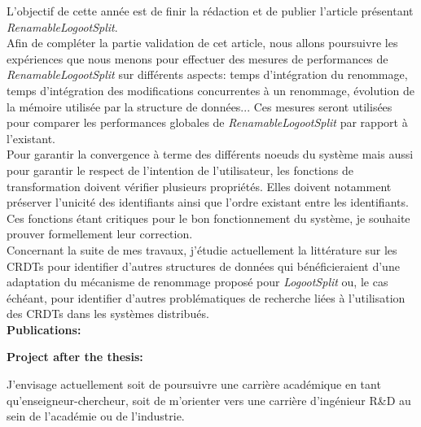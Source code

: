 \documentclass[12pt]{article}
\newcommand{\commentaire}[1]{}
\begin{document}
L'objectif de cette année est de finir la rédaction et de publier l'article présentant \emph{RenamableLogootSplit}.
\\

Afin de compléter la partie validation de cet article, nous allons poursuivre les expériences que nous menons pour effectuer des mesures de performances de \emph{RenamableLogootSplit} sur différents aspects: temps d'intégration du renommage, temps d'intégration des modifications concurrentes à un renommage, évolution de la mémoire utilisée par la structure de données...
Ces mesures seront utilisées pour comparer les performances globales de \emph{RenamableLogootSplit} par rapport à l'existant.
\\

Pour garantir la convergence à terme des différents noeuds du système mais aussi pour garantir le respect de l'intention de l'utilisateur, les fonctions de transformation doivent vérifier plusieurs propriétés.
Elles doivent notamment préserver l'unicité des identifiants ainsi que l'ordre existant entre les identifiants.
Ces fonctions étant critiques pour le bon fonctionnement du système, je souhaite prouver formellement leur correction.
\\

Concernant la suite de mes travaux, j'étudie actuellement la littérature sur les \acp{CRDT} pour identifier d'autres structures de données qui bénéficieraient d'une adaptation du mécanisme de renommage proposé pour \emph{LogootSplit} ou, le cas échéant, pour identifier d'autres problématiques de recherche liées à l'utilisation des \acp{CRDT} dans les systèmes distribués.
\\

\noindent\textbf{Publications:}
\commentaire{%
  if any}


\nocite{*}

\noindent\textbf{Project after the thesis:}
\commentaire{%
  for 3rd year (and beyond) PhD students: professional project\\}

J'envisage actuellement soit de poursuivre une carrière académique en tant qu'enseigneur-chercheur, soit de m'orienter vers une carrière d'ingénieur R\&D au sein de l'académie ou de l'industrie.
\\
\end{document}
